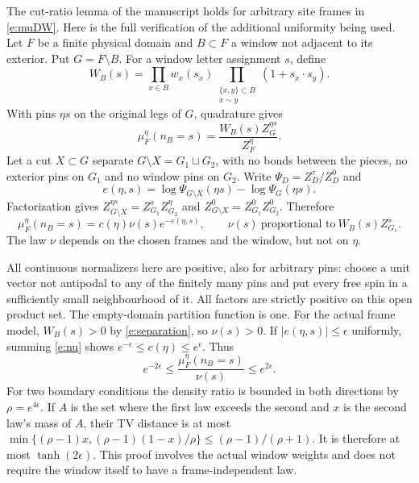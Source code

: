 \documentclass[11pt,reqno]{amsart}
\theoremstyle{definition}
\begin{document}
The cut-ratio lemma of the manuscript holds for arbitrary site frames
in \eqref{e:muDW}. Here is the full verification of the additional
uniformity being used. Let $F$ be a finite physical domain and
$B\subset F$ a window not adjacent to its exterior. Put $G=F\setminus B$.
For a window letter assignment $s$, define
\[
 W_B(s)=\prod_{x\in B}w_x(s_x)
                \prod_{\substack{\{x,y\}\subset B\\x\sim y}}(1+s_x\cdot s_y).
\]
With pins $\eta s$ on the original legs of $G$, quadrature gives
\begin{equation}\label{e:windowlaw}
 \mu_F^\eta(n_B=s)=\frac{W_B(s)Z_G^{\eta s}}{Z_F^\eta}.
\end{equation}
Let a cut $X\subset G$ separate $G\setminus X=G_1\sqcup G_2$, with
no bonds between the pieces, no exterior pins on $G_1$ and no window
pins on $G_2$. Write $\Psi_D=Z_D^\tau/Z_D^0$ and
\[
 e(\eta,s)=\log\Psi_{G\setminus X}(\eta s)-\log\Psi_G(\eta s).
\]
Factorization gives
$Z_{G\setminus X}^{\eta s}=Z_{G_1}^{s}Z_{G_2}^{\eta}$ and
$Z_{G\setminus X}^{0}=Z_{G_1}^{0}Z_{G_2}^{0}$. Therefore
\begin{equation}\label{e:nu}
 \mu_F^\eta(n_B=s)=c(\eta)\nu(s)e^{-e(\eta,s)},\qquad
 \nu(s)\ \text{proportional to}\ W_B(s)Z_{G_1}^{s}.
\end{equation}
The law $\nu$ depends on the chosen frames and the window, but not
on $\eta$.

All continuous normalizers here are positive, also for arbitrary
pins: choose a unit vector not antipodal to any of the finitely
many pins and put every free spin in a sufficiently small neighbourhood
of it. All factors are strictly positive on this open product set.
The empty-domain partition function is one. For the actual frame
model, $W_B(s)>0$ by \eqref{e:separation}, so $\nu(s)>0$.
If $|e(\eta,s)|\le\epsilon$ uniformly, summing \eqref{e:nu} shows
$e^{-\epsilon}\le c(\eta)\le e^\epsilon$. Thus
\begin{equation}\label{e:cutratio}
 e^{-2\epsilon}\le\frac{\mu_F^\eta(n_B=s)}{\nu(s)}
                   \le e^{2\epsilon}.
\end{equation}
For two boundary conditions the density ratio is bounded in both
directions by $\rho=e^{4\epsilon}$. If $A$ is the set where the first
law exceeds the second and $x$ is the second law's mass of $A$,
their TV distance is at most
$\min\{(\rho-1)x,(\rho-1)(1-x)/\rho\}\le(\rho-1)/(\rho+1)$.
It is therefore at most $\tanh(2\epsilon)$. This proof involves
the actual window weights and does not require the window itself
to have a frame-independent law.
\end{document}
